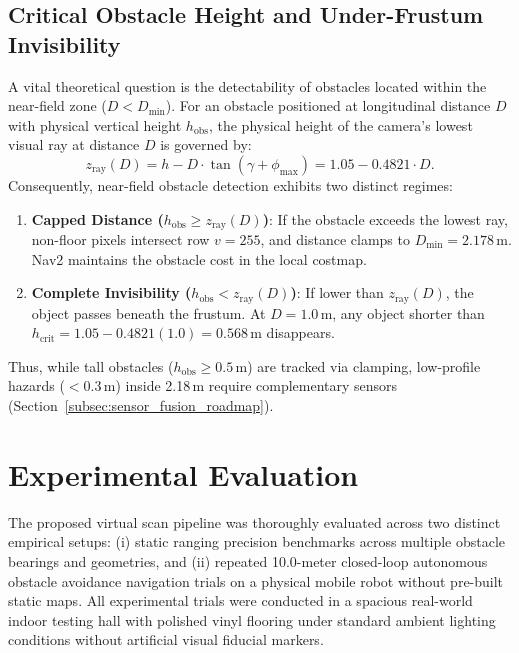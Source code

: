 \documentclass{ieeeaccess}
\begin{document}
\subsection{Critical Obstacle Height and Under-Frustum Invisibility}
\label{subsec:critical_height}
A vital theoretical question is the detectability of obstacles located within the near-field zone ($D < D_{\min}$). For an obstacle positioned at longitudinal distance $D$ with physical vertical height $h_{\mathrm{obs}}$, the physical height of the camera's lowest visual ray at distance $D$ is governed by:
\begin{equation}
  z_{\mathrm{ray}}(D) = h - D \cdot \tan(\gamma + \phi_{\max}) = 1.05 - 0.4821 \cdot D.
  \label{eq:ray_height}
\end{equation}
Consequently, near-field obstacle detection exhibits two distinct regimes:
\begin{enumerate}
  \item \textbf{Capped Distance ($h_{\mathrm{obs}} \ge z_{\mathrm{ray}}(D)$)}: If the obstacle exceeds the lowest ray, non-floor pixels intersect row $v = 255$, and distance clamps to $D_{\min} = 2.178$\,m. Nav2 maintains the obstacle cost in the local costmap.
  \item \textbf{Complete Invisibility ($h_{\mathrm{obs}} < z_{\mathrm{ray}}(D)$)}: If lower than $z_{\mathrm{ray}}(D)$, the object passes beneath the frustum. At $D = 1.0$\,m, any object shorter than $h_{\mathrm{crit}} = 1.05 - 0.4821(1.0) = 0.568$\,m disappears.
\end{enumerate}
Thus, while tall obstacles ($h_{\mathrm{obs}} \ge 0.5$\,m) are tracked via clamping, low-profile hazards ($<0.3$\,m) inside 2.18\,m require complementary sensors (Section~\ref{subsec:sensor_fusion_roadmap}).

\section{Experimental Evaluation}
\label{sec:experiments}

The proposed virtual scan pipeline was thoroughly evaluated across two distinct empirical setups: (i) static ranging precision benchmarks across multiple obstacle bearings and geometries, and (ii) repeated 10.0-meter closed-loop autonomous obstacle avoidance navigation trials on a physical mobile robot without pre-built static maps. All experimental trials were conducted in a spacious real-world indoor testing hall with polished vinyl flooring under standard ambient lighting conditions without artificial visual fiducial markers.
\end{document}
